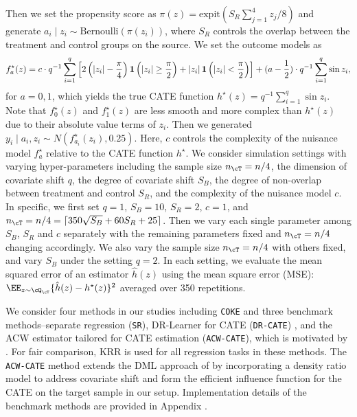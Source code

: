 \documentclass[12pt,a4paper,pdftex,onepage]{article}
\begin{document}
Then we set the propensity score as $\pi(z) = \mathrm{expit}(S_R\sum_{j=1}^4z_j/8)$ and generate  $a_i \mid z_i \sim \mathrm{Bernoulli}(\pi(z_i))$, where $S_R$ controls the overlap between the treatment and control groups on the source. We set the outcome models as
\[
f_a^\star(z) = c \cdot q^{-1}\sum_{i=1}^q\left[2 \left( \left| z_i \right| - \frac{\pi}{4} \right) \bold{1}\left( \left| z_i \right| \geq \frac{\pi}{2} \right) + \left| z_i \right| \bold{1}\left( \left| z_i \right| < \frac{\pi}{2} \right) \right]
+ (a - \frac{1}{2}) \cdot q^{-1}\sum_{i=1}^q\sin z_i,
\]
for $a = 0, 1$, which yields the true CATE function $h^\star(z) = q^{-1}\sum_{i=1}^q\sin z_i$. Note that $f_0^\star(z)$ and $f_1^\star(z)$ are less smooth and more complex than $h^\star(z)$ due to their absolute value terms of $z_i$. Then we generated $y_i \mid a_i, z_i \sim N(f_{a_i}^\star(z_i), 0.25)$. Here, $c$ controls the complexity of the nuisance model $f_a^\star$ relative to the CATE function $h^\star$. We consider simulation settings with varying hyper-parameters including the sample size $n_{\cT}=n/4$, the dimension of covariate shift $q$, the degree of covariate shift $S_B$, the degree of non-overlap between treatment and control $S_R$, and the complexity of the nuisance model $c$. In specific, we first set $q=1$, $S_B = 10$, $S_R = 2$, $c = 1$, and $n_{\cT}=n/4=\lceil 350\sqrt{S_B}+60S_R+25 \rceil$. Then we vary each single parameter among $S_B$, $S_R$ and $c$ separately with the remaining parameters fixed and $n_{\cT}=n/4$ changing accordingly. We also vary the sample size $n_{\cT}=n/4$ with others fixed, and vary $S_B$ under the setting $q=2$. In each setting, we evaluate the mean squared error of an estimator $\hat{h}(z)$ using the mean square error (MSE): $\EE_{z \sim \cQ_\cT}\{\hat{h}(z) - h^\star(z)\}^2$ averaged over 350 repetitions.


We consider four methods in our studies including \texttt{COKE} and three benchmark methods--separate regression (\texttt{SR}), DR-Learner for CATE (\texttt{DR-CATE}) \citep{kennedy2020towards}, and the ACW estimator tailored for CATE estimation (\texttt{ACW-CATE}), which is motivated by \cite{lee2023improving}. For fair comparison, KRR is used for all regression tasks in these methods. The \texttt{ACW-CATE} method extends the DML approach of \cite{kennedy2020towards} by incorporating a density ratio model to address covariate shift and form the efficient influence function for the CATE on the target sample in our setup. Implementation details of the benchmark methods are provided in Appendix .
\end{document}
